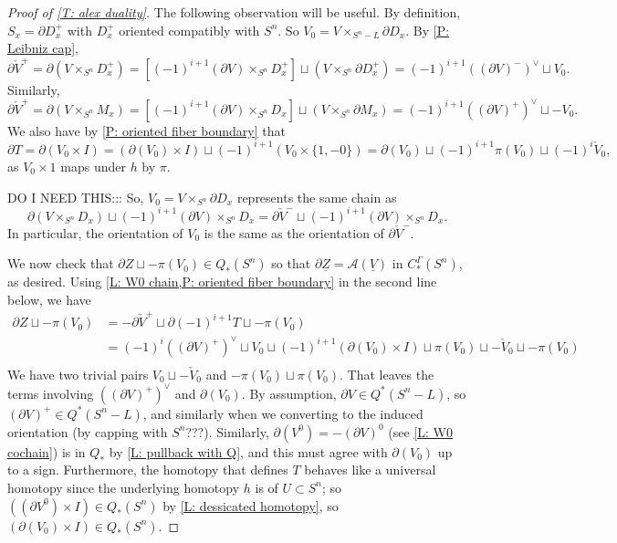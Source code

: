 \documentclass[12pt]{article}
\theoremstyle{plain}
\theoremstyle{definition}
\theoremstyle{remark}
\newcommand{\uV}{\underline{V}}
\newcommand{\bd}{\partial}
\newcommand{\mc}[1]{\mathcal{#1}}
\begin{document}
\begin{proof}[Proof of \cref{T: alex duality}]
The following observation will be useful.
By definition, $S_x = \bd D_x^+$ with $D_x^+$ oriented compatibly with $S^n$.
So $V_0 = V \times_{S^n-L} \bd D_x$.
By \cref{P: Leibniz cap}, $$\bd \check V^+ = \bd(V \times_{S^n} D_x^+) = \left[(-1)^{i+1} (\bd V) \times_{S^n} D_x^+\right] \sqcup (V \times_{S^n} \bd D_x^+)=(-1)^{i+1} ((\bd V)^-)^\vee \sqcup V_0.$$
Similarly,  $$\bd \check V^+ = \bd(V \times_{S^n} M_x) = \left[(-1)^{i+1} (\bd V) \times_{S^n} D_x\right] \sqcup (V \times_{S^n} \bd M_x)=(-1)^{i+1} ((\bd V)^+)^\vee \sqcup -V_0.$$
We also have by \cref{P: oriented fiber boundary} that $$\bd T = \bd (V_0 \times I) = (\bd (V_0) \times I) \sqcup (-1)^{i+1} (V_0 \times \{1,-0\}) =  \bd (V_0)  \sqcup (-1)^{i+1}\pi(V_0)\sqcup (-1)^i\check V_0,$$
as $V_0 \times 1$ maps under $h$ by $\pi$.

DO I NEED THIS:::
So, $V_0 = V \times_{S^n} \bd D_x$ represents the same chain as $$\bd(V \times_{S^n} D_x) \sqcup (-1)^{i+1} (\bd V) \times_{S^n} D_x = \bd \check  V^- \sqcup (-1)^{i+1} (\bd V) \times_{S^n} D_x.$$
In particular, the orientation of $V_0$ is the same as the orientation of $\bd \check  V^-$.


We now check that $\bd Z \sqcup -\pi(V_0) \in Q_*(S^n)$ so that $\bd \underline{Z} = \mc A(\uV)$ in $C_*^\Gamma(S^n)$, as desired.
Using \cref{L: W0 chain,P: oriented fiber boundary} in the second line below, we have
\begin{align*}
\bd Z \sqcup -\pi(V_0) & = -\bd \check V^+ \sqcup \bd (-1)^{i+1}T \sqcup  -\pi(V_0)\\
&=(-1)^{i} ((\bd V)^+)^\vee \sqcup V_0  \sqcup (-1)^{i+1}(\bd (V_0) \times I) \sqcup \pi(V_0)\sqcup -\check V_0 \sqcup  -\pi(V_0)\\
\end{align*}
We have two trivial pairs $V_0 \sqcup -\check V_0$ and $ -\pi(V_0) \sqcup \pi(V_0)$.
That leaves the terms involving $((\bd V)^+)^\vee$ and $\bd (V_0)$.
By assumption, $\bd V \in Q^*(S^n-L)$, so $(\bd V)^+ \in Q^*(S^n-L)$, and similarly when we converting to the induced orientation (by capping with $S^n$???).
Similarly, $\bd (V^0) = -(\bd V)^0$ (see \cref{L: W0 cochain}) is in $Q_*$ by \cref{L: pullback with Q}, and this must agree with $\bd (V_0)$ up to a sign.
Furthermore, the homotopy that defines $T$ behaves like a universal homotopy since the underlying homotopy $h$ is of $U \subset S^n$; so $((\bd V^0) \times I) \in Q_*(S^n)$ by \cref{L: dessicated homotopy}, so
$(\bd (V_0) \times I) \in Q_*(S^n)$.



\end{proof}
\end{document}
